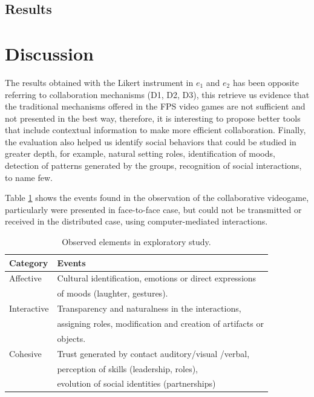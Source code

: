 \documentclass[conference]{./sty/IEEEtran}
\begin{document}
\subsection{Results}
\label{sec:results}

\section{Discussion}
\label{sec:discussion}
The results obtained with the Likert instrument in $e_1$ and $e_2$ has been opposite referring to collaboration mechanisms (D1, D2, D3), this retrieve us evidence that the traditional mechanisms offered in the FPS video games are not sufficient and not presented in the best way, therefore, it is interesting to propose better tools that include contextual information to make more efficient collaboration. Finally, the evaluation also helped us identify social behaviors that could be studied in greater depth, for example, natural setting roles, identification of moods, detection of patterns generated by the groups, recognition of social interactions, to name few.

Table \ref{tab:faceToFaceIndicators} shows the events found in the observation of the collaborative videogame, particularly were presented in face-to-face case, but could not be transmitted or received in the distributed case, using computer-mediated interactions.

\begin{table}[htbp]
	\centering
	\begin{tabular}{ll}
			\hline
		 	Category & Events \\
			\hline
			 Affective & Cultural identification, emotions or direct expressions \\
			 & of moods (laughter, gestures). \\
			 Interactive & Transparency and naturalness in the interactions, \\
			 & assigning roles, modification and creation of artifacts or \\
			 & objects. \\
			 Cohesive & Trust generated by contact auditory/visual /verbal, \\
			 & perception of skills (leadership, roles), \\
		   & evolution of social identities (partnerships) \\
			\hline	 
	\end{tabular}
	\caption{Observed elements in exploratory study.}
	\label{tab:faceToFaceIndicators}
\end{table}
\end{document}
